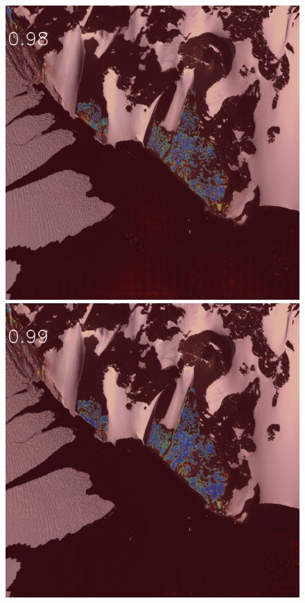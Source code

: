 \documentclass[runningheads]{llncs}
\begin{document}
\begin{figure}[h]
\includegraphics[width=\subFigx]{./fig/datagrow/MSE_single_unet_train_0_3.txt_bias-1_bs128_do0.1e25/WV02_20110131195115_1030010009CCF900_11JAN31195115-M1BS-052549143040_01_P003_u08rf3031.png}
\includegraphics[width=\subFigx]{./fig/datagrow/MSE_single_unet_train_0_4.txt_bias-1_bs128_do0.1e25/WV02_20110131195115_1030010009CCF900_11JAN31195115-M1BS-052549143040_01_P003_u08rf3031.png}



\end{figure}
\end{document}
